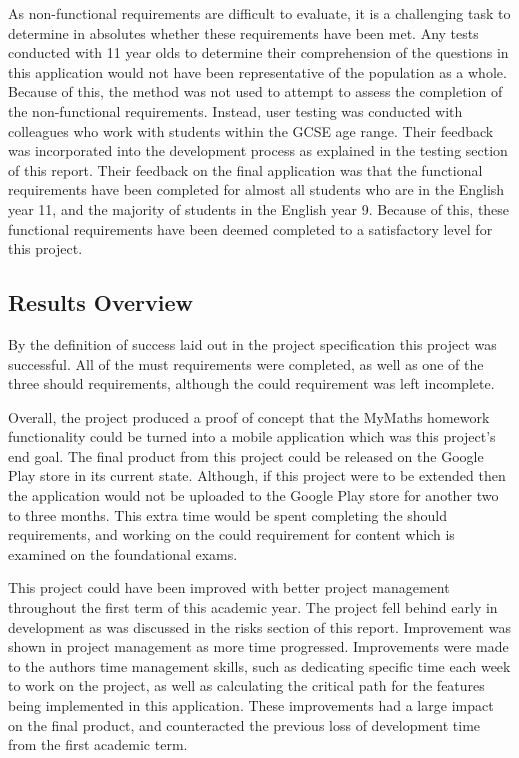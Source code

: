 \documentclass{article}
\begin{document}
As non-functional requirements are difficult to evaluate, it is a challenging task to determine in absolutes whether these requirements have been met. Any tests conducted with 11 year olds to determine their comprehension of the questions in this application would not have been representative of the population as a whole. Because of this, the method was not used to attempt to assess the completion of the non-functional requirements. Instead, user testing was conducted with colleagues who work with students within the GCSE age range. Their feedback was incorporated into the development process as explained in the testing section of this report. Their feedback on the final application was that the functional requirements have been completed for almost all students who are in the English year 11, and the majority of students in the English year 9. Because of this, these functional requirements have been deemed completed to a satisfactory level for this project. \par

\subsection{Results Overview}

By the definition of success laid out in the project specification this project was successful. All of the must requirements were completed, as well as one of the three should requirements, although the could requirement was left incomplete. \par

Overall, the project produced a proof of concept that the MyMaths homework functionality could be turned into a mobile application which was this project's end goal. The final product from this project could be released on the Google Play store in its current state. Although, if this project were to be extended then the application would not be uploaded to the Google Play store for another two to three months. This extra time would be spent completing the should requirements, and working on the could requirement for content which is examined on the foundational exams. \par

This project could have been improved with better project management throughout the first term of this academic year. The project fell behind early in development as was discussed in the risks section of this report. Improvement was shown in project management as more time progressed. Improvements were made to the authors time management skills, such as dedicating specific time each week to work on the project, as well as calculating the critical path for the features being implemented in this application. These improvements had a large impact on the final product, and counteracted the previous loss of development time from the first academic term. \par
\end{document}
